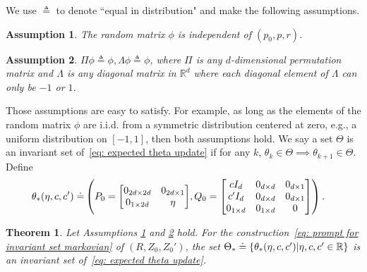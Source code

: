 \documentclass{article}
\newcommand{\fS}{\mathcal{S}}
\newcommand{\R}{\mathbb{R}}
\newcommand{\ns}{{|\fS|}}
\newtheorem{theorem}{Theorem}
\newtheorem{assumption}{Assumption}[section]
\begin{document}
We use $\triangleq$ to denote ``equal in distribution" and make the following assumptions.
\begin{assumption}
    \label{assumption independence}
    The random matrix $\phi$ is independent of $(p_0, p, r)$.
\end{assumption}
\begin{assumption}
    \label{assumption symmetry}
    $\Pi \phi \triangleq \phi, \Lambda \phi \triangleq \phi$,
    where $\Pi$ is any $d$-dimensional permutation matrix and $\Lambda$ is any diagonal matrix in $\R^d$ where each diagonal element of $\Lambda$ can only be $-1$ or $1$.
\end{assumption}
Those assumptions are easy to satisfy.
For example,
as long as the elements of the random matrix $\phi$ are i.i.d. from a symmetric distribution centered at zero, e.g., a uniform distribution on $[-1, 1]$,
then both assumptions hold.
We say a set $\Theta$ is an invariant set of~\eqref{eq: expected theta update} if for any $k$, $\theta_k \in \Theta \implies \theta_{k+1} \in \Theta$.
Define
\begin{align}
            \theta_*(\eta, c, c') \doteq&  \textstyle \left(P_0 = \mqty[0_{2d \times 2d} & 0_{2d \times 1} \\ 0_{1 \times 2d} & \eta], Q_0 =  \mqty[c I_d & 0_{d \times d} & 0_{d \times 1} \\ c' I_d  & 0_{d \times d} & 0_{d \times 1} \\ 0_{1 \times d} & 0_{1 \times d} & 0] \right)  \label{eq: optimal single layer}.
         \end{align}
\begin{theorem}
    Let Assumptions \ref{assumption independence} and \ref{assumption symmetry} hold.
    For the construction~\eqref{eq: prompt for invariant set markovian} of $(R, Z_0, Z_0')$,
    the set $\Theta_* \doteq \qty{\theta_*(\eta, c, c') | \eta, c, c' \in \R}$ is an invariant set of~\eqref{eq: expected theta update}.
\label{thm: fixed point analysis}
\end{theorem}
\end{document}
